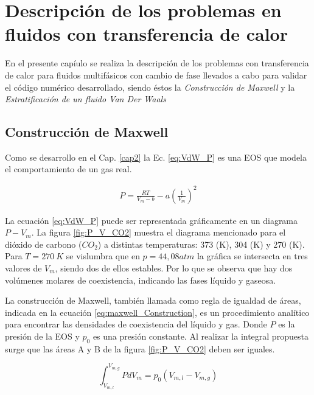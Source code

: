 \chapter{Descripción de los problemas en fluidos con transferencia de calor }
\graphicspath{{figs/cap4/}}
\label{cap4}

En el presente capíulo se realiza la descripción de los problemas con transferencia de calor para fluidos multifásicos con cambio de fase llevados a cabo para validar el código numérico desarrollado, siendo éstos la \textit{Construcción de Maxwell} y la \textit{Estratificación de un fluido Van Der Waals}

\section{Construcción de Maxwell}

Como se desarrollo en el Cap. \ref{cap2} la Ec. \ref{eq:VdW_P} es una EOS que modela el comportamiento de un gas real.

\begin{align}
P = \frac{R T}{V_m - b} - a {(\frac{1}{V_m})}^2
\label{eq:VdW_P}
\end{align}

La ecuación \ref{eq:VdW_P} puede ser representada gráficamente en un diagrama $P - V_m$. La figura \ref{fig:P_V_CO2} muestra el diagrama mencionado para el dióxido de carbono ($CO_2$) a distintas temperaturas: 373 (K), 304 (K) y 270 (K). Para $T = 270 \> K$ se vislumbra que en $p = 44,08 atm$ la gráfica se intersecta en tres valores de $V_m$, siendo dos de ellos estables. Por lo que se observa que hay dos volúmenes molares de coexistencia, indicando las fases líquido y gaseosa.

La construcción de Maxwell, también llamada como regla de igualdad de áreas, indicada en la ecuación \ref{eq:maxwell_Construction}, es un procedimiento analítico para encontrar las densidades de coexistencia del líquido y gas. Donde $P$ es la presión de la EOS y $p_0$ es una presión constante. Al realizar la integral propuesta surge que las áreas A y B de la figura \ref{fig:P_V_CO2} deben ser iguales.

\begin{equation}
\int_{V_{m,l}}^{V_{m,g}} P d V_m = p_0 (V_{m,l} -  V_{m,g})
\label{eq:maxwell_Construction}
\end{equation}

